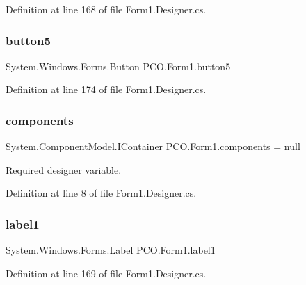 Definition at line 168 of file Form1.\+Designer.\+cs.

\mbox{\label{classPCO_1_1Form1_a1a8057e529d3c7f692722d9d265aacf8}} 
\subsubsection{\texorpdfstring{button5}{button5}}
{\footnotesize\ttfamily System.\+Windows.\+Forms.\+Button P\+C\+O.\+Form1.\+button5\hspace{0.3cm}{\ttfamily [private]}}



Definition at line 174 of file Form1.\+Designer.\+cs.

\mbox{\label{classPCO_1_1Form1_a3b09f718fe7978234deb2b07c408fa71}} 
\subsubsection{\texorpdfstring{components}{components}}
{\footnotesize\ttfamily System.\+Component\+Model.\+I\+Container P\+C\+O.\+Form1.\+components = null\hspace{0.3cm}{\ttfamily [private]}}



Required designer variable. 



Definition at line 8 of file Form1.\+Designer.\+cs.

\mbox{\label{classPCO_1_1Form1_a28dd6ac426e555c53e48107162d37833}} 
\subsubsection{\texorpdfstring{label1}{label1}}
{\footnotesize\ttfamily System.\+Windows.\+Forms.\+Label P\+C\+O.\+Form1.\+label1\hspace{0.3cm}{\ttfamily [private]}}



Definition at line 169 of file Form1.\+Designer.\+cs.

